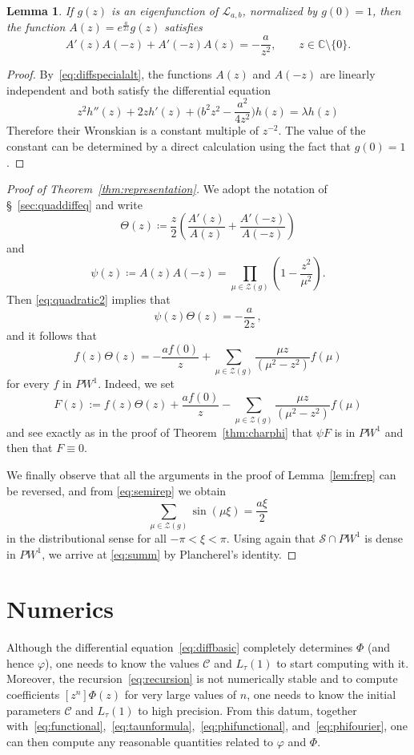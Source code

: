 \documentclass[12pt]{amsart}
\theoremstyle{plain}
\newtheorem{lemma}[theorem]{Lemma}
\numberwithin{equation}{section}
\theoremstyle{definition}
\newcommand{\C}{\mathbb{C}}
\renewcommand{\phi}{\varphi}
\newcommand{\Cone}{\mathscr{C}}
\begin{document}
\begin{lemma}
	If $g(z)$ is an eigenfunction of $\mathcal{L}_{a,b}$, normalized by
	$g(0)=1$, then the function
	$A(z)=e^{\frac{a}{2z}}g(z)$ satisfies
	\begin{equation}\label{eq:quadratic2}
		A'(z)A(-z)+A'(-z)A(z) = -\frac{a}{z^2},\qquad z\in \C\setminus \{0\}.
	\end{equation}
\end{lemma}
\begin{proof}
	By~\eqref{eq:diffspecialalt}, the functions $A(z)$ and $A(-z)$ are linearly independent and both satisfy the differential equation
	\[z^2h''(z)+2zh'(z)+\Big(b^2z^2-\frac{a^2}{4z^2}\Big)h(z)=\lambda h(z)\]
	Therefore their Wronskian is a constant multiple of $z^{-2}$. The value of 
	the constant can be determined by a direct calculation using the fact that 
	$g(0)=1$.
\end{proof}
\begin{proof}[Proof of Theorem~\ref{thm:representation}]
	We adopt the notation of \S~\ref{sec:quaddiffeq} and write
	\[ \Theta (z) \coloneqq \frac{z}{2} 
	\left(\frac{A'(z)}{A(z)}+\frac{A'(-z)}{A(-z)}\right)\]
	and 
	\[
	\psi(z) \coloneqq  A(z)A(-z) = \prod_{\mu\in \mathcal{Z}(g)}
	\left(1-\frac{z^2}{\mu^2}\right).
	\]
Then \eqref{eq:quadratic2} implies that
	\[
	\psi(z)\Theta(z) = -\frac{a}{2z}\, ,
	\]
and it follows that
	\begin{equation}\label{eq:semirep}
		f(z) \Theta(z) =
		-\frac{a f(0)}{z} + \sum_{\mu\in \mathcal{Z}(g)} \frac{\mu 
			z}{(\mu^2-z^2)} f(\mu)
			\end{equation}
	for every $f$ in $PW^1$. Indeed, we set
	\[
	F(z):= f(z)\Theta(z) +\frac{a f(0)}{z} - \sum_{\mu\in \mathcal{Z}(g)} 
	\frac{\mu
		z}{(\mu^2-z^2)} f(\mu)
	\]
	and see exactly as in the proof of Theorem~\ref{thm:charphi} that $\psi F$ is in $PW^1$ and then that $F\equiv 0$.
	
	We finally observe that all the arguments in the proof of Lemma~\ref{lem:frep} can be
	reversed, and from \eqref{eq:semirep} we obtain
	\[
	\sum_{\mu\in \mathcal{Z}(g)} \sin(\mu \xi) = \frac{a \xi}{2}
	\]
	in the distributional sense for all $-\pi< \xi < \pi$. Using again that $\mathcal{S}\cap PW^1$ is dense in $PW^1$, we 
	arrive at \eqref{eq:summ} by  Plancherel's identity.
\end{proof}


\section{Numerics}\label{sec:numerics}
Although the differential equation~\eqref{eq:diffbasic} completely determines $\Phi$ (and hence $\phi$), one needs to know the values $\Cone$ and $L_{\tau}(1)$ to start computing with it. Moreover, the recursion~\eqref{eq:recursion} is not numerically stable and to compute coefficients $[z^n]\Phi(z)$ for very large values of $n$, one needs to know the initial parameters $\Cone$ and $L_{\tau}(1)$ to high precision. From this datum, together with~\eqref{eq:functional},~\eqref{eq:taunformula},~\eqref{eq:phifunctional}, and~\eqref{eq:phifourier}, one can then compute any reasonable quantities related to $\phi$ and $\Phi$.
\end{document}
